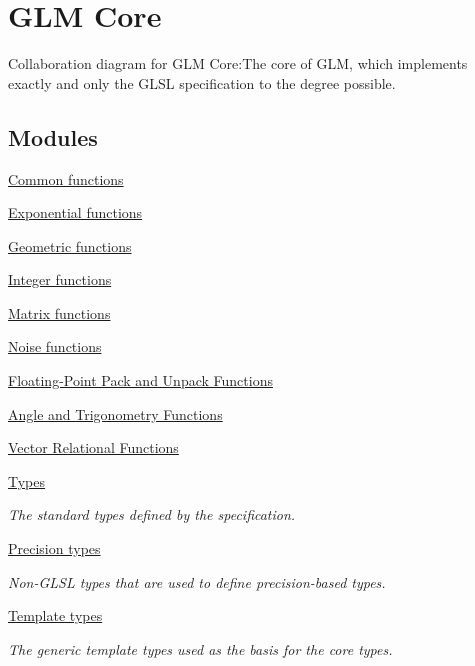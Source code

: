 \hypertarget{group__core}{
\section{GLM Core}
\label{group__core}
}


Collaboration diagram for GLM Core:The core of GLM, which implements exactly and only the GLSL specification to the degree possible.  
\subsection*{Modules}
\begin{CompactItemize}
\item 
\hyperlink{group__core__func__common}{Common functions}
\item 
\hyperlink{group__core__func__exponential}{Exponential functions}
\item 
\hyperlink{group__core__func__geometric}{Geometric functions}
\item 
\hyperlink{group__core__func__integer}{Integer functions}
\item 
\hyperlink{group__core__func__matrix}{Matrix functions}
\item 
\hyperlink{group__core__func__noise}{Noise functions}
\item 
\hyperlink{group__core__func__packing}{Floating-Point Pack and Unpack Functions}
\item 
\hyperlink{group__core__func__trigonometric}{Angle and Trigonometry Functions}
\item 
\hyperlink{group__core__func__vector__relational}{Vector Relational Functions}
\item 
\hyperlink{group__core__types}{Types}
\begin{CompactList}\small\item\em The standard types defined by the specification. \item\end{CompactList}

\item 
\hyperlink{group__core__precision}{Precision types}
\begin{CompactList}\small\item\em Non-GLSL types that are used to define precision-based types. \item\end{CompactList}

\item 
\hyperlink{group__core__template}{Template types}
\begin{CompactList}\small\item\em The generic template types used as the basis for the core types. \item\end{CompactList}

\end{CompactItemize}


